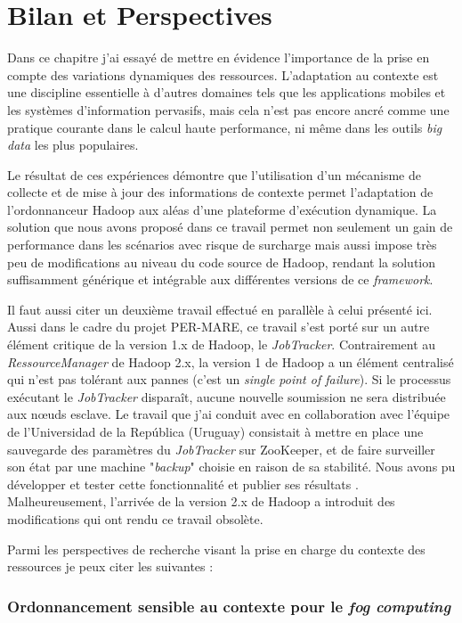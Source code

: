 \section{Bilan et Perspectives}

Dans ce chapitre j'ai essayé de mettre en évidence l'importance de la prise en compte des variations dynamiques des ressources. L'adaptation au contexte est une discipline essentielle à d'autres domaines tels que les applications mobiles et  les systèmes d'information pervasifs, mais cela n'est pas encore ancré comme une pratique courante dans le calcul haute performance, ni même dans les outils \textit{big data} les plus populaires. 

Le résultat de ces expériences démontre que l'utilisation d'un mécanisme de collecte et de mise à jour des informations de contexte permet l'adaptation de l'ordonnanceur Hadoop aux aléas d'une plateforme d'exécution dynamique. La solution que nous avons proposé dans ce travail permet non seulement un gain de performance dans les scénarios avec risque de surcharge mais aussi impose très peu de modifications au niveau du code source de Hadoop, rendant la solution suffisamment générique et intégrable aux différentes versions de ce \textit{framework}. 

Il faut aussi citer un deuxième travail effectué en parallèle à celui présenté ici. Aussi dans le cadre du projet PER-MARE, ce travail s'est porté sur un autre élément critique de la version 1.x de Hadoop, le \textit{JobTracker}. Contrairement au \textit{RessourceManager} de Hadoop 2.x, la version 1 de Hadoop a un élément centralisé qui n'est pas tolérant aux pannes (c'est un \textit{single point of failure}). Si le processus exécutant le \textit{JobTracker} disparaît, aucune nouvelle soumission ne sera distribuée aux n{\oe}uds esclave. Le travail que j'ai conduit avec en collaboration avec l'équipe de l'Universidad de la República (Uruguay) consistait à mettre en place une sauvegarde des paramètres du \textit{JobTracker} sur ZooKeeper, et de faire surveiller son état par une machine "\textit{backup}" choisie en raison de sa stabilité. Nous avons pu développer et tester cette fonctionnalité et publier ses résultats \cite{Steffenel2015-WoC, Rey14a}. Malheureusement, l'arrivée de la version 2.x de Hadoop a introduit des modifications qui ont rendu ce travail obsolète. 

Parmi les perspectives de recherche visant la prise en charge du contexte des ressources je peux citer les suivantes :

\subsubsection*{Ordonnancement sensible au contexte pour le \textit{fog computing}}

